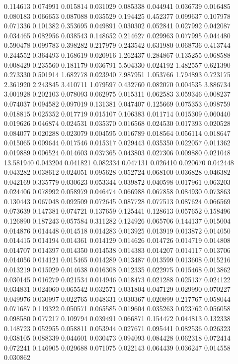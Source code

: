 0.114613
0.074991
0.015814
0.031029
0.085338
0.044941
0.036739
0.016485
0.080183
0.066653
0.087088
0.035529
0.194425
0.452377
0.099637
0.107978
0.071336
0.101382
0.353695
0.049891
0.030302
0.052841
0.027992
0.042087
0.034465
0.082956
0.038543
0.148652
0.214627
0.029963
0.077995
0.044480
0.590478
0.099783
0.398282
0.217979
0.243542
0.631980
0.068736
0.413744
0.244552
0.364493
0.168619
0.020916
1.262437
0.284867
0.135255
0.068588
0.008429
0.235560
0.181179
0.036791
5.504330
0.024192
1.482557
0.621390
0.273330
0.501914
1.682778
0.023940
7.987951
1.053766
1.794893
0.723175
2.361920
2.243845
3.410711
1.079597
0.432760
0.082070
0.004535
3.886734
3.001928
0.202103
0.078093
0.062975
0.015311
0.062583
3.059346
0.008237
0.074037
0.094582
0.097019
0.131381
0.047407
0.125669
0.075353
0.098759
0.018815
0.025352
0.017719
0.015107
0.106383
0.011714
0.015309
0.060440
0.019626
0.046874
0.024531
0.035370
0.016568
0.024530
0.017393
0.020528
0.084077
0.020288
0.023079
0.004595
0.016789
0.018564
0.056114
0.018647
0.015065
0.009644
0.017546
0.015317
0.029443
0.035350
0.022057
0.011362
0.019889
0.006524
0.014603
0.037365
0.043803
0.027306
0.009880
0.021048
13.581940
0.043204
0.041821
0.082334
0.047131
0.026410
0.020670
0.042448
0.043282
0.038612
0.024051
0.095628
0.052724
0.068100
0.036828
0.046382
0.042169
0.335779
0.030623
0.053344
0.039872
0.040598
0.017961
0.063203
0.024406
0.078992
0.058979
0.046474
0.066988
0.067858
0.084930
0.073863
0.130443
0.067048
0.092509
0.072645
0.087728
0.077513
0.087624
0.066569
0.073639
0.147381
0.074721
0.137659
0.125441
0.128613
0.057652
0.158496
0.126890
0.187243
0.057584
0.311282
0.124926
0.065706
0.144137
0.015004
0.014876
0.014448
0.014518
0.014283
0.013925
0.013919
0.013872
0.014050
0.014415
0.014194
0.014361
0.014129
0.014626
0.014726
0.014719
0.014808
0.014707
0.014397
0.014350
0.014538
0.014383
0.014207
0.014117
0.013706
0.014056
0.014121
0.015465
0.014289
0.013487
0.013599
0.013608
0.015216
0.013219
0.015029
0.014638
0.016308
0.012335
0.022975
0.015468
0.013862
0.030145
0.016279
0.021534
0.014946
0.018473
0.021288
0.025137
0.024122
0.034831
0.024060
0.065542
0.032571
0.031804
0.047129
0.029990
0.070227
0.049976
0.030997
0.022765
0.048331
0.030367
0.020899
0.217767
0.058044
0.071687
0.119322
0.050571
0.065585
0.019604
0.035263
0.023762
0.056058
0.098580
0.077217
0.109794
0.039491
0.066871
0.154472
0.044813
0.132338
0.148723
0.052955
0.058811
0.053944
0.027671
0.095441
0.082536
0.026323
0.038105
0.088339
0.044601
0.030473
0.094093
0.084428
0.062318
0.072414
0.072241
0.146905
0.029688
0.071075
0.022143
0.064439
0.036247
0.014558
0.030862
